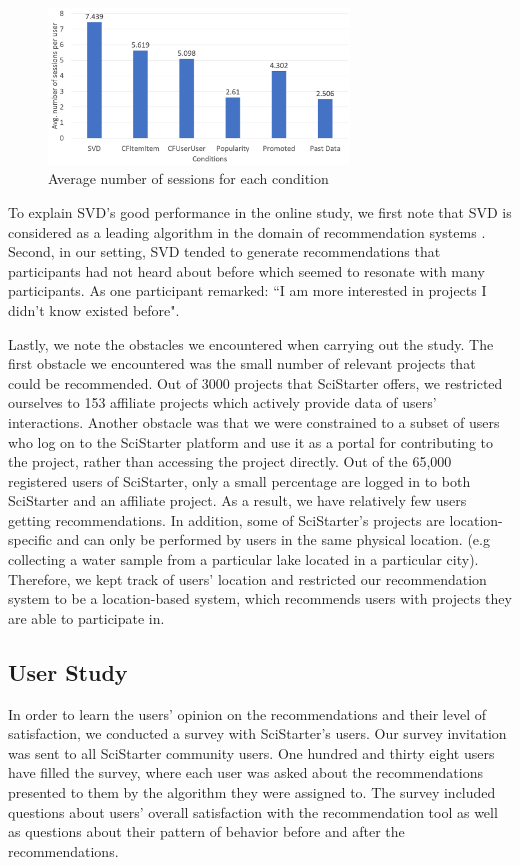 \documentclass[letterpaper]{article} %
\begin{document}
\begin{figure}[t]
     \centering
    \includegraphics[width=8cm]{Figs/results2.png}
    \caption{Average number of sessions  for each condition}
     \label{fig:results2}%
 \end{figure}


To explain SVD's good performance in the online study, we first note that SVD is considered as a leading algorithm in the domain of recommendation systems \cite{sadek2012svd}.
Second, in our setting, SVD tended to generate recommendations that participants had not heard about before which seemed to resonate with many participants. As one participant remarked: ``I am more interested in projects I didn't know existed before".


Lastly, we note the obstacles we encountered when carrying out the study.
The first obstacle we encountered was the small number of relevant projects that could be recommended. Out of 3000 projects that SciStarter offers, we restricted ourselves to  153 affiliate projects which actively provide data of users' interactions.
Another obstacle was that we were constrained to a  subset of users who log on to the SciStarter platform
 and use it as a portal for contributing to  the project, rather than accessing the project
 directly.
Out of the 65,000 registered users of SciStarter, only a small percentage are logged in to both SciStarter and an affiliate project. As a result, we have relatively few users getting recommendations. In addition, some of SciStarter's projects are location-specific and can only be performed by users in the same physical location. (e.g collecting a water sample from a particular lake located in a particular city). Therefore, we kept track of users' location and restricted our recommendation system to be a location-based system, which recommends users with projects they are able to participate in.



\subsection {User Study}
In order to learn the users' opinion on the recommendations and their level of satisfaction, we conducted a survey with SciStarter's users. Our survey invitation was sent to all SciStarter community users. One hundred and thirty eight users have filled the survey, where each user was asked about the recommendations presented to them by the  algorithm they were assigned to. The survey included questions about users' overall satisfaction with the recommendation tool as well as questions about their pattern of behavior before and after the recommendations.
\end{document}
